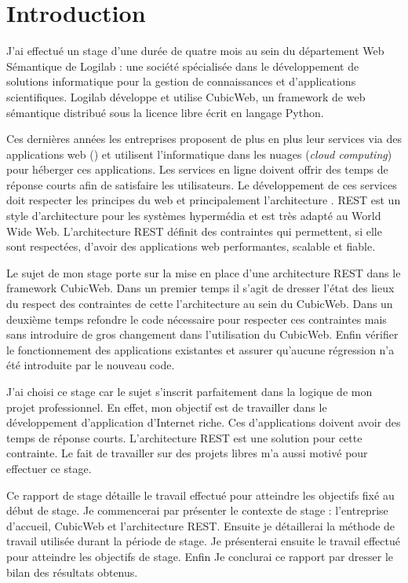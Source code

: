 \chapter*{Introduction} 
J'ai effectué un stage d'une durée de quatre mois au sein du département Web
Sémantique de Logilab : une société spécialisée dans le développement de
solutions informatique pour la gestion de connaissances et d'applications
scientifiques. Logilab développe et utilise CubicWeb, un framework de web
sémantique distribué sous la licence libre  écrit en
langage Python. 

Ces dernières années les entreprises proposent de plus en plus leur services
via des applications web (\textit{}) et
utilisent l'informatique dans les nuages (\textit{cloud computing}) pour
héberger ces applications. Les services en ligne doivent offrir des temps de
réponse courts afin de satisfaire les utilisateurs. Le développement de ces
services doit respecter les principes du web et principalement l'architecture
. REST est un style d'architecture pour les systèmes
hypermédia et est très adapté au World Wide Web. L'architecture REST définit
des contraintes qui permettent, si elle sont respectées, d'avoir des
applications web performantes, scalable et fiable.

Le sujet de mon stage porte sur la mise en place d'une architecture REST dans
le framework CubicWeb. Dans un premier temps il s'agit de dresser l'état des
lieux du respect des contraintes de cette l'architecture au sein du CubicWeb.
Dans un deuxième temps refondre le code nécessaire pour respecter ces
contraintes mais sans introduire de gros changement dans l'utilisation du
CubicWeb. Enfin vérifier le fonctionnement des applications existantes et
assurer qu'aucune régression n'a été introduite par le nouveau code.

J'ai choisi ce stage car le sujet s'inscrit parfaitement dans la logique de mon
projet professionnel. En effet, mon objectif est de travailler dans le
développement d'application d'Internet riche. Ces d'applications doivent avoir
des temps de réponse courts. L'architecture REST est une solution pour cette
contrainte. Le fait de travailler sur des projets libres m'a aussi motivé pour
effectuer ce stage.

Ce rapport de stage détaille le travail effectué pour atteindre les objectifs
fixé au début de stage. Je commencerai par présenter le contexte de stage :
l'entreprise d'accueil, CubicWeb et l'architecture REST. Ensuite je détaillerai
la méthode de travail utilisée durant la période de stage. Je présenterai
ensuite le travail effectué pour atteindre les objectifs de stage. Enfin Je
conclurai ce rapport par dresser le bilan des résultats obtenus.
